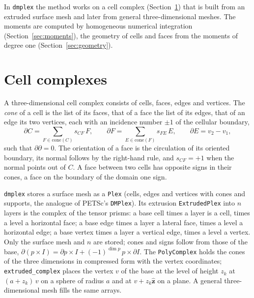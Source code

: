 \documentclass[preprint,12pt]{elsarticle}
\newcommand{\code}[1]{\texttt{#1}}
\theoremstyle{definition}
\begin{document}
In \code{dmplex} the method works on a cell complex (Section~\ref{sec:complex}) that is built from an
extruded surface mesh and later from general three-dimensional meshes. The moments are computed by
homogeneous numerical integration~\cite{Lasserre1998,Chin2015} (Section~\ref{sec:moments}), the
geometry of cells and faces from the moments of degree one (Section~\ref{sec:geometry}).

\section{Cell complexes}\label{sec:complex}

A three-dimensional cell complex consists of cells, faces, edges and vertices. The \emph{cone} of a
cell is the list of its faces, that of a face the list of its edges, that of an edge its two
vertices, each with an incidence number $\pm1$ of the cellular boundary,
\begin{equation}
\partial C = \sum_{F\in\mathrm{cone}(C)} s_{CF}\,F,\qquad \partial F = \sum_{E\in\mathrm{cone}(F)}
s_{FE}\,E,\qquad \partial E = v_2 - v_1,
\end{equation}
such that $\partial\partial = 0$. The orientation of a face is the circulation of its oriented
boundary, its normal follows by the right-hand rule, and $s_{CF}=+1$ when the normal points out of
$C$. A face between two cells has opposite signs in their cones, a face on the boundary of the
domain one sign.

\code{dmplex} stores a surface mesh as a \code{Plex} (cells, edges and vertices with cones and
supports, the analogue of PETSc's \code{DMPlex}). Its extrusion \code{ExtrudedPlex} into $n$ layers is
the complex of the tensor prisms: a base cell times a layer is a cell, times a level a horizontal face;
a base edge times a layer a lateral face, times a level a horizontal edge; a base vertex times a layer
a vertical edge, times a level a vertex. Only the surface mesh and $n$ are stored; cones and signs follow
from those of the base, $\partial(p\times I) = \partial p\times I + (-1)^{\dim p}\,p\times\partial I$.
The \code{PolyComplex} holds the cones of the three dimensions in compressed form with the vertex
coordinates; \code{extruded\_complex} places the vertex $v$ of the base at the level of height $z_k$
at $(a+z_k)\,v$ on a sphere of radius $a$ and at $v+z_k\hat{\mathbf z}$ on a plane. A general
three-dimensional mesh fills the same arrays.
\end{document}
